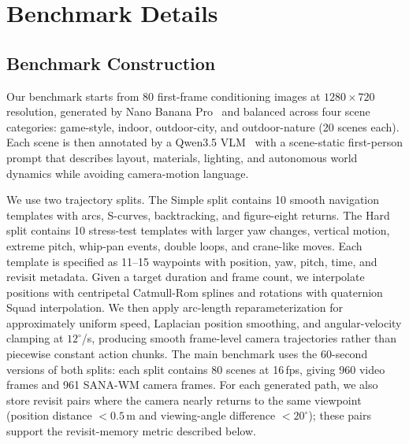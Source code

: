\documentclass{llmxive}
\providecommand{\modelname}{SANA-WM\xspace}
\begin{document}
\section{Benchmark Details}
\label{sec:appendix_benchmark}

\subsection{Benchmark Construction}
\label{sec:appendix_benchmark_construction}

Our benchmark starts from 80 first-frame conditioning images at $1280{\times}720$ resolution, generated by Nano Banana Pro~\citep{google2025nanobananapro} and balanced across four scene categories: game-style, indoor, outdoor-city, and outdoor-nature (20 scenes each).
Each scene is then annotated by a Qwen3.5 VLM~\citep{qwen3_5} with a scene-static first-person prompt that describes layout, materials, lighting, and autonomous world dynamics while avoiding camera-motion language.

\noindent We use two trajectory splits.
The Simple split contains 10 smooth navigation templates with arcs, S-curves, backtracking, and figure-eight returns.
The Hard split contains 10 stress-test templates with larger yaw changes, vertical motion, extreme pitch, whip-pan events, double loops, and crane-like moves.
Each template is specified as 11--15 waypoints with position, yaw, pitch, time, and revisit metadata.
Given a target duration and frame count, we interpolate positions with centripetal Catmull-Rom splines and rotations with quaternion Squad interpolation.
We then apply arc-length reparameterization for approximately uniform speed, Laplacian position smoothing, and angular-velocity clamping at $12^\circ$/s, producing smooth frame-level camera trajectories rather than piecewise constant action chunks.
The main benchmark uses the 60-second versions of both splits: each split contains 80 scenes at 16\,fps, giving 960 video frames and 961 \modelname camera frames.
For each generated path, we also store revisit pairs where the camera nearly returns to the same viewpoint (position distance $<0.5$\,m and viewing-angle difference $<20^\circ$); these pairs support the revisit-memory metric described below.
\end{document}
